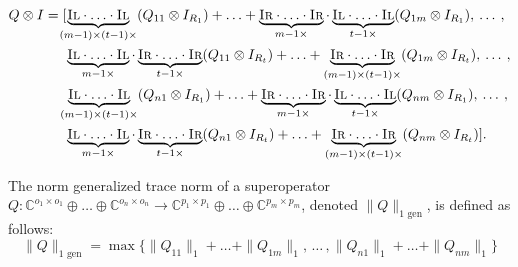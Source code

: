 \begin{equation} \label{eq:gen_tensor_identity}
  \begin{split}
   Q \otimes I & =  [ \hspace{-5pt} \underbrace{\textsc{Il} \cdot \ldots \cdot \textsc{Il}}_{(m-1) \times ( t-1) \times} (Q_{11} \otimes I_{R_1} ) + \ldots +  \underbrace{\textsc{Ir} \cdot \ldots \cdot \textsc{Ir}}_{m-1  \times}  \cdot  \underbrace{\textsc{Il} \cdot \ldots \cdot \textsc{Il}}_{t-1 \times} (Q_{1m} \otimes I_{R_1}), \hspace{2pt} \ldots \hspace{2pt},  \\
   & \hspace{15pt} \underbrace{\textsc{Il} \cdot \ldots \cdot \textsc{Il}}_{m-1 \times}\cdot \underbrace{\textsc{Ir} \cdot \ldots \cdot \textsc{Ir}}_{t-1  \times}  (Q_{11} \otimes I_{R_t})  + \ldots +  \underbrace{\textsc{Ir} \cdot \ldots \cdot \textsc{Ir}}_{(m-1) \times (t-1) \times}(Q_{1m} \otimes I_{R_t}), \hspace{2pt} \ldots \hspace{2pt},  \\
    & \hspace{10pt}\underbrace{\textsc{Il} \cdot \ldots \cdot \textsc{Il}}_{(m-1) \times ( t-1) \times} (Q_{n1} \otimes I_{R_1}) + \ldots +  \underbrace{\textsc{Ir} \cdot \ldots \cdot \textsc{Ir}}_{m-1  \times}  \cdot  \underbrace{\textsc{Il} \cdot \ldots \cdot \textsc{Il}}_{t-1 \times} (Q_{nm} \otimes I_{R_1}), \hspace{2pt} \ldots \hspace{2pt},  \\
    & \hspace{15pt} \underbrace{\textsc{Il} \cdot \ldots \cdot \textsc{Il}}_{m-1  \times} \cdot \underbrace{\textsc{Ir} \cdot \ldots \cdot \textsc{Ir}}_{t-1  \times}  (Q_{n1} \otimes I_{R_t})  + \ldots + \underbrace{\textsc{Ir} \cdot \ldots \cdot \textsc{Ir}}_{(m-1) \times (t-1) \times}(Q_{nm} \otimes I_{R_t})].
  \end{split}
\end{equation}



\begin{definition} \label{def:gen_1norm}
  The norm generalized trace norm of a superoperator $Q: \mathbb{C}^{o_1 \times o_1} \oplus \ldots \oplus \mathbb{C}^{o_n \times o_n}  \rightarrow \mathbb{C}^{p_1 \times p_1} \oplus \ldots \oplus  \mathbb{C}^{p_m \times p_m} $, denoted $\|Q\|_{1 \text{ gen}}$, is defined as follows:
\begin{equation}
    \|Q\|_{1 \text{ gen}} = \max \{\|Q_{11}\|_{1} + \ldots + \|Q_{1m}\|_{1}, \hspace{2pt} \ldots \hspace{2pt}, \|Q_{n1}\|_{1} + \ldots + \|Q_{nm}\|_{1} \}
\end{equation}
\end{definition}


